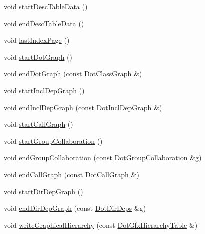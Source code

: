 \begin{DoxyCompactItemize}
\item 
void \hyperlink{class_latex_generator_a2fca61002fe342c603e112cc4e99921f}{start\+Desc\+Table\+Data} ()
\item 
void \hyperlink{class_latex_generator_aa3830e8ae350a66bbec769c2a9337305}{end\+Desc\+Table\+Data} ()
\item 
void \hyperlink{class_latex_generator_a5bd03c7e1a88abb8d5445bec8581b2aa}{last\+Index\+Page} ()
\item 
void \hyperlink{class_latex_generator_a0b8173550d071d48f622c079d6644766}{start\+Dot\+Graph} ()
\item 
void \hyperlink{class_latex_generator_a32fb1304b77bc952caeaa77da648fd2d}{end\+Dot\+Graph} (const \hyperlink{class_dot_class_graph}{Dot\+Class\+Graph} \&)
\item 
void \hyperlink{class_latex_generator_ae34e761905a08ff5ec95bcd9668729a3}{start\+Incl\+Dep\+Graph} ()
\item 
void \hyperlink{class_latex_generator_adf3644a1a735b0f1109400e8733c2b9d}{end\+Incl\+Dep\+Graph} (const \hyperlink{class_dot_incl_dep_graph}{Dot\+Incl\+Dep\+Graph} \&)
\item 
void \hyperlink{class_latex_generator_a0efcfff69a3e26f29f186b9d626128c3}{start\+Call\+Graph} ()
\item 
void \hyperlink{class_latex_generator_afda9dc899675e9f29af32a30812a5c8b}{start\+Group\+Collaboration} ()
\item 
void \hyperlink{class_latex_generator_a4f5a9cd27f543d3e22e0c1cb3decc429}{end\+Group\+Collaboration} (const \hyperlink{class_dot_group_collaboration}{Dot\+Group\+Collaboration} \&\hyperlink{060__command__switch_8tcl_af08b4b5bfa9edf0b0a7dee1c2b2c29e0}{g})
\item 
void \hyperlink{class_latex_generator_a04796ce1fdfb4dedbbe17b1fdffca000}{end\+Call\+Graph} (const \hyperlink{class_dot_call_graph}{Dot\+Call\+Graph} \&)
\item 
void \hyperlink{class_latex_generator_abc79ee7e0a83ce1b804189f74d55d899}{start\+Dir\+Dep\+Graph} ()
\item 
void \hyperlink{class_latex_generator_abe85ace3e82260352e73fc91fc787423}{end\+Dir\+Dep\+Graph} (const \hyperlink{class_dot_dir_deps}{Dot\+Dir\+Deps} \&\hyperlink{060__command__switch_8tcl_af08b4b5bfa9edf0b0a7dee1c2b2c29e0}{g})
\item 
void \hyperlink{class_latex_generator_a837cdd6757718e6c2aac97fade95d2b7}{write\+Graphical\+Hierarchy} (const \hyperlink{class_dot_gfx_hierarchy_table}{Dot\+Gfx\+Hierarchy\+Table} \&)
\item 

\end{DoxyCompactItemize}
